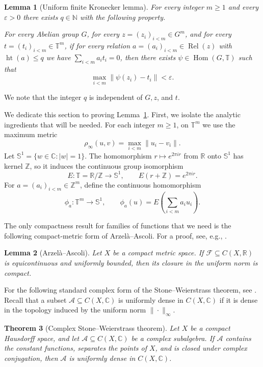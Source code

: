 \documentclass[11pt]{amsart}
\newtheorem{theorem}{Theorem}[section]
\newtheorem{lemma}[theorem]{Lemma}
\theoremstyle{definition}
\newcommand{\T}{\mathbb T}
\newcommand{\N}{\mathbb N}
\newcommand{\Z}{\mathbb Z}
\newcommand{\Hom}{\operatorname{Hom}}
\newcommand{\Rel}{\operatorname{Rel}}
\newcommand{\htop}{\operatorname{ht}}
\begin{document}
\begin{lemma}[Uniform finite Kronecker lemma]\label{lem:uniform-kronecker}
For every integer $m\geq1$ and every $\varepsilon>0$ there exists $q\in\N$
with the following property.

For every Abelian group $G$, for every
$z=(z_i)_{i<m}\in G^m$, and for every
$t=(t_i)_{i<m}\in\T^m$, if for every relation
$a=(a_i)_{i<m}\in\Rel(z)$ with $\htop(a)\leq q$ we have
$\sum_{i<m}a_i t_i=0$, then there exists $\psi\in\Hom(G,\T)$ such that
\[
 \max_{i<m}\|\psi(z_i)-t_i\|<\varepsilon.
\]
\end{lemma}
We note that the integer $q$ is independent of $G,z$, and $t$.

We dedicate this section to proving Lemma~\ref{lem:uniform-kronecker}.
First, we isolate the analytic ingredients that will be needed.  For each
integer $m\geq1$, on $\T^m$ we use the maximum metric
\[
 \rho_\infty(u,v)=\max_{i<m}\|u_i-v_i\|.
\]
Let $\mathbb S^1=\{w\in\mathbb C:|w|=1\}$.  The homomorphism
$r\mapsto e^{2\pi i r}$ from $\mathbb R$ onto $\mathbb S^1$ has kernel
$\mathbb Z$, so it induces the continuous group isomorphism
\[
 E:\T=\mathbb R/\mathbb Z\longrightarrow\mathbb S^1,
 \qquad E(r+\mathbb Z)=e^{2\pi i r}.
\]
For $a=(a_i)_{i<m}\in\Z^m$, define the continuous homomorphism
\[
 \phi_a:\T^m\longrightarrow\mathbb S^1,
 \qquad \phi_a(u)=E\left(\sum_{i<m}a_i u_i\right).
\]

The only compactness result for families of functions that we need is the
following compact-metric form of Arzel\`a--Ascoli.  For a proof, see, e.g.,
\cite[Theorem~8.2.10]{Engelking1989}.

\begin{lemma}[Arzel\`a--Ascoli]\label{lem:arzela-ascoli-uniform}
Let $X$ be a compact metric space.  If
$\mathcal F\subseteq C(X,\mathbb R)$ is equicontinuous and uniformly bounded,
then its closure in the uniform norm is compact.
\end{lemma}

For the following standard complex form of the Stone--Weierstrass theorem,
see \cite[Theorem~7.33]{Rudin1976}.  Recall that a subset
$\mathcal A\subseteq C(X,\mathbb C)$ is uniformly dense in
$C(X,\mathbb C)$ if it is dense in the topology induced by the uniform norm
$\|\cdot\|_\infty$.

\begin{theorem}[Complex Stone--Weierstrass theorem]
\label{thm:complex-stone-weierstrass}
Let $X$ be a compact Hausdorff space, and let
$\mathcal A\subseteq C(X,\mathbb C)$ be a complex subalgebra.  If
$\mathcal A$ contains the constant functions, separates the points of $X$,
and is closed under complex conjugation, then $\mathcal A$ is uniformly dense
in $C(X,\mathbb C)$.
\end{theorem}
\end{document}
